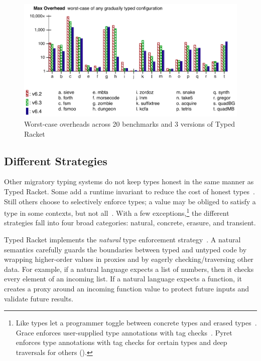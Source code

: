 \begin{figure}[h]
  \includegraphics[width=0.8\columnwidth]{src/jfp-2019-max.png}
  \caption{Worst-case overheads across 20 benchmarks and 3 versions of Typed Racket~\cite{gtnffvf-jfp-2019}}
  \label{fig:max-overhead}
\end{figure}


\subsection{Different Strategies}

Other migratory typing systems do not keep types honest in the
 same manner as Typed Racket.
Some add a runtime invariant to reduce the cost of honest types~\cite{wnlov-popl-2010,bmt-ecoop-2010,mt-oopsla-2017,rat-oopsla-2017}.
Still others choose to selectively enforce types; a value may be obliged to
 satisfy a type in some contexts, but not all~\cite{vss-popl-2017}.
With a few exceptions,\footnote{Like types
 let a programmer toggle between concrete types and erased types~\cite{wnlov-popl-2010,rzv-ecoop-2015}.
 Grace enforces user-supplied type annotations with tag checks~\cite{rmhn-ecoop-2019}.
 Pyret enforces type annotations with tag checks
  for certain types and deep traversals for others ().}
 the different strategies fall into four broad categories:
 natural, concrete, erasure, and transient.

Typed Racket implements the \emph{natural}\/ type enforcement
 strategy~\cite{mf-toplas-2009,tf-popl-2008}.
A natural semantics carefully guards the boundaries between typed and untyped
 code by wrapping higher-order values in proxies and by eagerly
 checking/traversing other data.
For example, if a natural language expects a list of numbers, then it
 checks every element of an incoming list.
If a natural language expects a function, it creates a proxy around an incoming
 function value to protect future inputs and validate future results.

